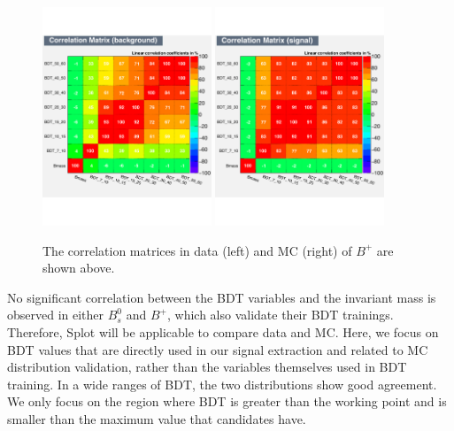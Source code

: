 \begin{figure}[h]
\begin{center}
\includegraphics[width=0.45\textwidth]{Figures/Chapter4/BPBDTCorrB.pdf}
\includegraphics[width=0.45\textwidth]{Figures/Chapter4/BPBDTCorrS.pdf}
\caption{The correlation matrices in data (left) and MC (right) of $B^+$ are shown above.}
\label{BPBDTCorr}
\end{center}
\end{figure}


No significant correlation between the BDT variables and the invariant mass is observed in either $B^0_s$ and $B^+$, which also validate their BDT trainings. Therefore, Splot will be applicable to compare data and MC. Here, we focus on BDT values that are directly used in our signal extraction and related to MC distribution validation, rather than the variables themselves used in BDT training. In a wide ranges of BDT, the two distributions show good agreement. We only focus on the region where BDT is greater than the working point and is smaller than the maximum value that candidates have.

